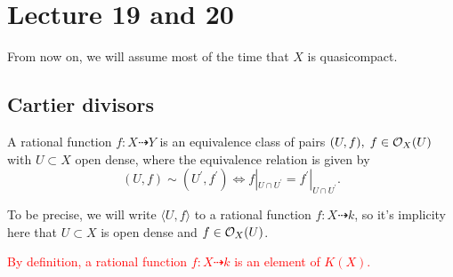 \section{Lecture 19 and 20}
From now on, we will assume most of the time that $X$ is quasicompact.
\subsection{Cartier divisors}
\begin{dang}
    \begin{definition}
        A rational function $f:X\dashrightarrow Y$ is an equivalence class 
        of pairs $(U,f),\;f\in\mathcal{O}_X(U)$ with $U\subset X$ open dense, where the equivalence relation is given by 
        \begin{equation}
            (U,f)\sim (U^\prime, f^\prime)\iff f|_{U\cap U^\prime}=f^\prime|_{U\cap U^\prime}.
        \end{equation}
    \end{definition}
\end{dang}
\begin{notation}
    To be precise, we will write $\langle U,f\rangle$ to a rational function $f:X\dashrightarrow k$, so it's 
    implicity here that $U\subset X$ is open dense and $f\in\mathcal{O}_X(U)$.
\end{notation}
\begin{notation}
    \textcolor{red}{By definition, a rational function $f:X\dashrightarrow k$ is an element of $K(X)$.}
\end{notation}

